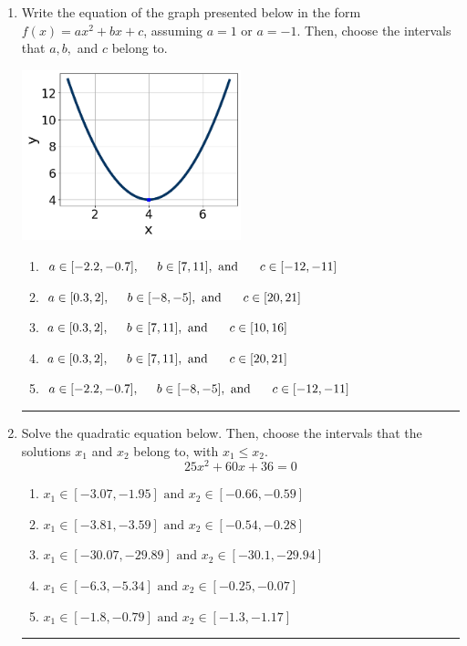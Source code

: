 \documentclass[14pt]{extbook}
\newcommand{\litem}[1]{\item#1\hspace*{-1cm}\rule{\textwidth}{0.4pt}}
\begin{document}
\begin{enumerate}
{\begin{enumerate}[label=\Alph*.]
\end{enumerate} }
\litem{
Write the equation of the graph presented below in the form $f(x)=ax^2+bx+c$, assuming  $a=1$ or $a=-1$. Then, choose the intervals that $a, b,$ and $c$ belong to.
\begin{center}
    \includegraphics[width=0.5\textwidth]{../Figures/quadraticGraphToEquationB.png}
\end{center}
\begin{enumerate}[label=\Alph*.]
\item \( a \in [-2.2, -0.7], \hspace*{5mm} b \in [7, 11], \text{ and } \hspace*{5mm} c \in [-12, -11] \)
\item \( a \in [0.3, 2], \hspace*{5mm} b \in [-8, -5], \text{ and } \hspace*{5mm} c \in [20, 21] \)
\item \( a \in [0.3, 2], \hspace*{5mm} b \in [7, 11], \text{ and } \hspace*{5mm} c \in [10, 16] \)
\item \( a \in [0.3, 2], \hspace*{5mm} b \in [7, 11], \text{ and } \hspace*{5mm} c \in [20, 21] \)
\item \( a \in [-2.2, -0.7], \hspace*{5mm} b \in [-8, -5], \text{ and } \hspace*{5mm} c \in [-12, -11] \)

\end{enumerate} }
\litem{
Solve the quadratic equation below. Then, choose the intervals that the solutions $x_1$ and $x_2$ belong to, with $x_1 \leq x_2$.\[ 25x^{2} +60 x + 36 = 0 \]\begin{enumerate}[label=\Alph*.]
\item \( x_1 \in [-3.07, -1.95] \text{ and } x_2 \in [-0.66, -0.59] \)
\item \( x_1 \in [-3.81, -3.59] \text{ and } x_2 \in [-0.54, -0.28] \)
\item \( x_1 \in [-30.07, -29.89] \text{ and } x_2 \in [-30.1, -29.94] \)
\item \( x_1 \in [-6.3, -5.34] \text{ and } x_2 \in [-0.25, -0.07] \)
\item \( x_1 \in [-1.8, -0.79] \text{ and } x_2 \in [-1.3, -1.17] \)

\end{enumerate} }
\end{enumerate}
\end{document}
